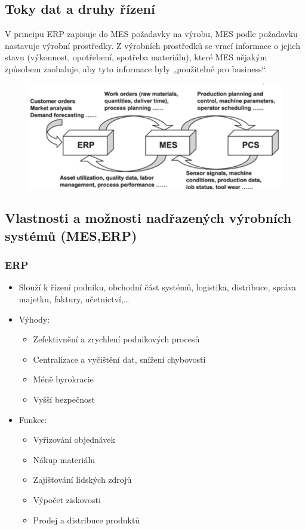   \subsection{Toky dat a druhy řízení}
  V principu ERP zapisuje do MES požadavky na výrobu, MES podle požadavku nastavuje výrobní prostředky. Z výrobních prostředků se vrací informace o jejich stavu (výkonnost, opotřebení, spotřeba materiálu), které MES nějakým způsobem zaobaluje, aby tyto informace byly „použitelné pro business“.

  \begin{figure}[h]
    \begin{center}
      \includegraphics[scale = 1]{img/picture3.png}
    \end{center}
  \end{figure}


  \subsection{Vlastnosti a možnosti nadřazených výrobních systémů (MES,ERP)}
  \subsubsection*{ERP}
  \begin{itemize}
    \item Slouží k řízení podniku, obchodní část systémů, logistika, distribuce, správa majetku, faktury, učetnictví,\dots
    \item Výhody:\begin{itemize}
        \item Zefektivnění a zrychlení podnikových procesů
        \item Centralizace a vyčištění dat, snížení chybovosti
        \item Méně byrokracie
        \item Vyšší bezpečnost
    \end{itemize}
    \item Funkce: \begin{itemize}
        \item Vyřizování objednávek
        \item Nákup materiálu
        \item Zajišťování lidských zdrojů
        \item Výpočet ziskovosti
        \item Prodej a distribuce produktů
    \end{itemize}
  \end{itemize}

